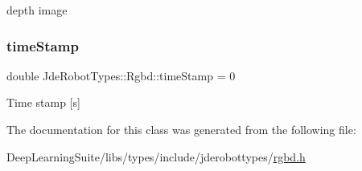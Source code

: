 depth image \mbox{\label{class_jde_robot_types_1_1_rgbd_a6cf1e3e9b469df3c599b711a2edcf6ba}} 
\subsubsection{\texorpdfstring{time\+Stamp}{timeStamp}}
{\footnotesize\ttfamily double Jde\+Robot\+Types\+::\+Rgbd\+::time\+Stamp = 0}

Time stamp \mbox{[}s\mbox{]} 

The documentation for this class was generated from the following file\+:\begin{DoxyCompactItemize}
\item 
Deep\+Learning\+Suite/libs/types/include/jderobottypes/\hyperlink{rgbd_8h}{rgbd.\+h}\end{DoxyCompactItemize}
